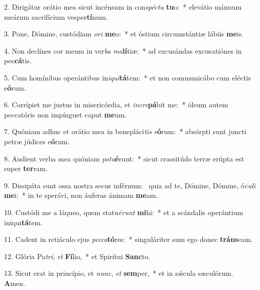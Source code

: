 2. Dirigátur orátio mea sicut incénsum in con\textit{spéc}\textit{tu} \textbf{tu}o:~*  elevátio mánuum meárum sacrifícium vesper\textbf{tí}num.\

3. Pone, Dómine, custódiam \textit{o}\textit{ri} \textbf{me}o:~*  et óstium circumstántiæ lábiis \textbf{me}is.\

4. Non declínes cor meum in ver\textit{ba} \textit{ma}\textbf{lí}tiæ:~*  ad excusándas excusatiónes in pec\textbf{cá}tis.\

5. Cum homínibus operántibus in\textit{i}\textit{qui}\textbf{tá}tem:~*  et non communicábo cum eléctis e\textbf{ó}rum.\

6. Corrípiet me justus in misericórdia, et \textit{in}\textit{cre}\textbf{pá}bit me:~*  óleum autem peccatóris non impínguet caput \textbf{me}um.\

7. Quóniam adhuc et orátio mea in benepláci\textit{tis} \textit{e}\textbf{ó}rum:~*  absórpti sunt juncti petræ júdices e\textbf{ó}rum.\

8. Audient verba mea quóniam \textit{pot}\textit{u}\textbf{é}runt:~*  sicut crassitúdo terræ erúpta est super \textbf{ter}ram.\

9. Dissipáta sunt ossa nostra secus inférnum: \dag\  quia ad te, Dómine, Dómine, ó\textit{cu}\textit{li} \textbf{me}i:~*  in te sperávi, non áuferas ánimam \textbf{me}am.\

10. Custódi me a láqueo, quem statu\textit{é}\textit{runt} \textbf{mi}hi:~*  et a scándalis operántium iniqui\textbf{tá}tem.\

11. Cadent in retiáculo ejus \textit{pec}\textit{ca}\textbf{tó}res:~*  singuláriter sum ego donec \textbf{tráns}eam.\

12. Glória Pa\textit{tri}, \textit{et} \textbf{Fí}lio,~*  et Spirítui \textbf{Sanc}to.\

13. Sicut erat in princípio, et \textit{nunc}, \textit{et} \textbf{sem}per,~*  et in sǽcula sæculórum. \textbf{A}men.\

